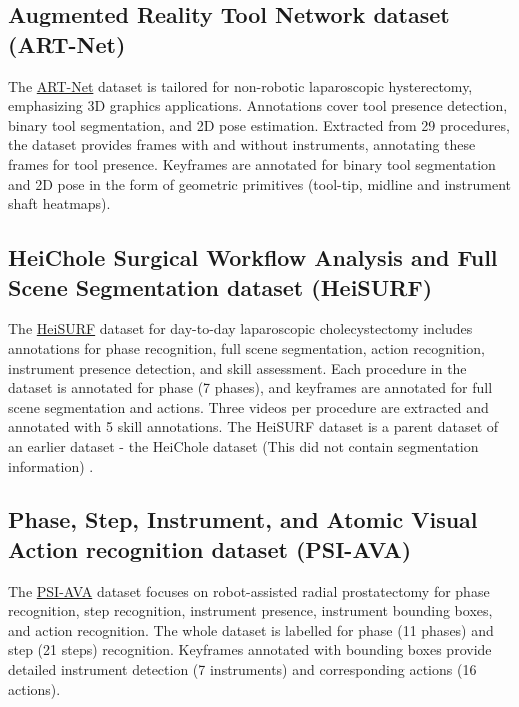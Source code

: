 \documentclass[times,twocolumn,final]{elsarticle}
\begin{document}
\subsection{Augmented Reality Tool Network dataset (ART-Net)}
The \href{https://github.com/kamruleee51/ART-Net}{ART-Net} dataset \citep{art_net} is tailored for non-robotic laparoscopic hysterectomy, emphasizing 3D graphics applications. Annotations cover tool presence detection, binary tool segmentation, and 2D pose estimation. Extracted from 29 procedures, the dataset provides frames with and without instruments, annotating these frames for tool presence. Keyframes are annotated for binary tool segmentation and 2D pose in the form of geometric primitives (tool-tip, midline and instrument shaft heatmaps).



\subsection{HeiChole Surgical Workflow Analysis and Full Scene Segmentation dataset (HeiSURF)}
The \href{https://www.synapse.org/#!Synapse:syn25101790/wiki/}{HeiSURF} dataset \citep{heisurf} for day-to-day laparoscopic cholecystectomy includes annotations for phase recognition, full scene segmentation, action recognition, instrument presence detection, and skill assessment. Each procedure in the dataset is annotated for phase (7 phases), and keyframes are annotated for full scene segmentation and actions. Three videos per procedure are extracted and annotated with 5 skill annotations. The HeiSURF dataset is a parent dataset of an earlier dataset - the HeiChole dataset (This did not contain segmentation information) \citep{WAGNER2023102770}.



\subsection{Phase, Step, Instrument, and Atomic Visual Action recognition dataset (PSI-AVA)}
The \href{https://github.com/BCV-Uniandes/TAPIR}{PSI-AVA} dataset \citep{holistic_scene_understanding} focuses on robot-assisted radial prostatectomy for phase recognition, step recognition, instrument presence, instrument bounding boxes, and action recognition. The whole dataset is labelled for phase (11 phases) and step (21 steps) recognition. Keyframes annotated with bounding boxes provide detailed instrument detection (7 instruments) and corresponding actions (16 actions).
\end{document}

